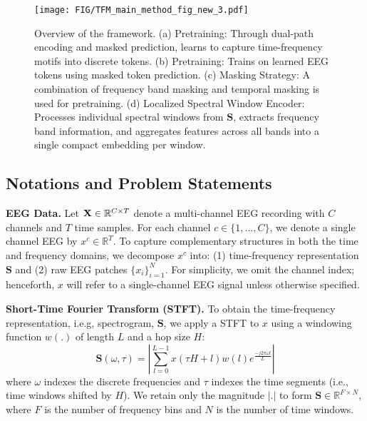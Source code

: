 \begin{figure*}[t]
    \centering
    \texttt{[image: FIG/TFM\_main\_method\_fig\_new\_3.pdf]}
    \caption{Overview of the \method framework. (a) \tokenizer Pretraining: Through dual-path encoding and masked prediction, learns to capture time-frequency motifs into discrete tokens. (b) \encoder Pretraining: Trains on learned EEG tokens using masked token prediction. (c) Masking Strategy: A combination of frequency band masking and temporal masking is used for \tokenizer pretraining. (d) Localized Spectral Window Encoder: Processes individual spectral windows from $\mathbf{S}$, extracts frequency band information, and aggregates features across all bands into a single compact embedding per window. }
    \label{fig:tfm_token}
\end{figure*}

\subsection{Notations and Problem Statements}
\noindent\textbf{EEG Data.}
Let $\mathbf{X}\in\mathbb{R}^{C\times T}$ denote a multi-channel EEG recording with $C$ channels and $T$ time samples. For each channel $c\in\{1,...,C\}$, we denote a single channel EEG by $x^c\in\mathbb{R}^T$. 
To capture complementary structures in both the time and frequency domains, we decompose $x^c$ into: (1) time-frequency representation $\mathbf{S}$ and (2) raw EEG patches $\{x_i\}_{i=1}^N$. For simplicity, we omit the channel index; henceforth, $x$ will refer to a single-channel EEG signal unless otherwise specified. 

\noindent\textbf{Short-Time Fourier Transform (STFT).}
To obtain the time-frequency representation, i.e.g, spectrogram, $\mathbf{S}$, we apply a STFT to $x$ using a windowing function $w(.)$ of length $L$ and a hop size $H$:
\begin{equation}
    \mathbf{S}(\omega,\tau) = \left|\sum_{l=0}^{L-1}x(\tau H +l)w(l)e^{\frac{-j2\pi\omega l}{L}} \right|
\end{equation}
where $\omega$ indexes the discrete frequencies and $\tau$ indexes the time segments (i.e., time windows shifted by $H$). We retain only the magnitude $|.|$ to form $\mathbf{S}\in \mathbb{R}^{F\times N}$, where $F$ is the number of frequency bins and $N$ is the number of time windows.
\\

